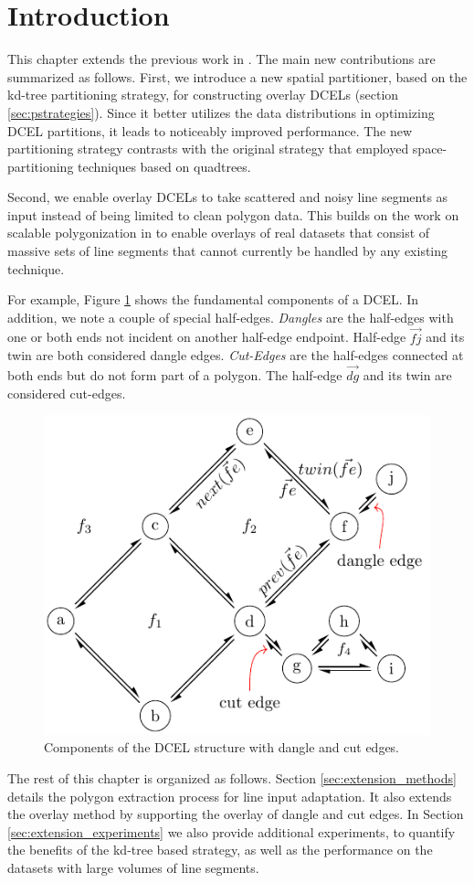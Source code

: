 \section{Introduction} %

This chapter extends the previous work in \cite{calderon_scalable_2023}. The main new contributions are summarized as follows. First, we introduce a new spatial partitioner, based on the kd-tree partitioning strategy, for constructing overlay  DCELs (section \ref{sec:pstrategies}). Since it better utilizes the data  distributions in optimizing DCEL partitions, it leads to noticeably improved performance. The new partitioning strategy contrasts with the original strategy that employed space-partitioning techniques based on quadtrees. 

Second, we enable overlay DCELs to take scattered and noisy line segments as input instead of being limited to clean polygon data.  This builds on the work on scalable polygonization in \cite{abdelhafeez_ddcel_2023} to enable overlays of real datasets that consist of massive sets of line segments that cannot currently be handled by any existing technique.  

For example, Figure \ref{fig:extension_dcel_example} shows the fundamental components of a DCEL.  In addition, we note a couple of special half-edges. \textit{Dangles} are the half-edges with one or both ends not incident on another half-edge endpoint. Half-edge \textit{$\overrightarrow{fj}$} and its twin are both considered dangle edges.  \textit{Cut-Edges} are the half-edges connected at both ends but do not form part of a polygon. The half-edge \textit{$\overrightarrow{dg}$} and its twin are considered cut-edges.

\begin{figure}
    \centering
    \includegraphics[width=0.6\linewidth]{chapterExtension/dcel_example2}
    \caption{Components of the DCEL structure with dangle and cut edges.}\label{fig:extension_dcel_example}
\end{figure}

The rest of this chapter is organized as follows.  Section \ref{sec:extension_methods} details the polygon extraction process for line input adaptation. It also extends the overlay method by supporting the overlay of dangle and cut edges. In Section \ref{sec:extension_experiments} we also provide additional experiments, to quantify the benefits of the kd-tree based strategy, as well as the performance on the datasets with large volumes of line segments.

